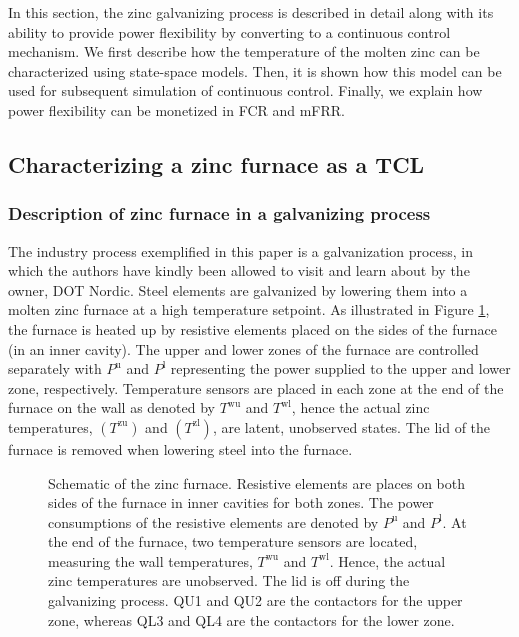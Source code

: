 \documentclass[sigconf]{acmart}
\begin{document}
In this section, the zinc galvanizing process is described in detail along with its ability to provide power flexibility by converting to a continuous control mechanism.
%
We first describe how the temperature of the molten zinc can be characterized using state-space models. Then, it is shown how this model can be used for subsequent simulation of continuous control. Finally, we explain how power flexibility can be monetized in FCR and mFRR.

\subsection{Characterizing a zinc furnace as a TCL}



\subsubsection{Description of zinc furnace in a galvanizing process}

The industry process exemplified in this paper is a galvanization process, in which the authors have kindly been allowed to visit and learn about by the owner, DOT Nordic. Steel elements are galvanized by lowering them into a molten zinc furnace at a high temperature setpoint. As illustrated in Figure \ref{fig:furnace_schematic_tikz}, the furnace is heated up by resistive elements placed on the sides of the furnace (in an inner cavity). The upper and lower zones of the furnace are controlled separately with $P^{\text{u}}$ and $P^{\text{l}}$ representing the power supplied to the upper and lower zone, respectively. Temperature sensors are placed in each zone at the end of the furnace on the wall as denoted by $T^{\text{wu}}$ and $T^{\text{wl}}$, hence the actual zinc temperatures, $(T^{\text{zu}})$ and $(T^{\text{zl}})$, are latent, unobserved states. The lid of the furnace is removed when lowering steel into the furnace.

\begin{figure}[t]
    \centering
    
    \caption{Schematic of the zinc furnace. Resistive elements are places on both sides of the furnace in inner cavities for both zones. The power consumptions of the resistive elements are denoted by $P^{\text{u}}$ and $P^{\text{l}}$. At the end of the furnace, two temperature sensors are located, measuring the wall temperatures, $T^{\text{wu}}$ and $T^{\text{wl}}$. Hence, the actual zinc temperatures are unobserved. The lid is off during the galvanizing process. QU1 and QU2 are the contactors for the upper zone, whereas QL3 and QL4 are the contactors for the lower zone.}
    \label{fig:furnace_schematic_tikz}
\end{figure}
\end{document}
